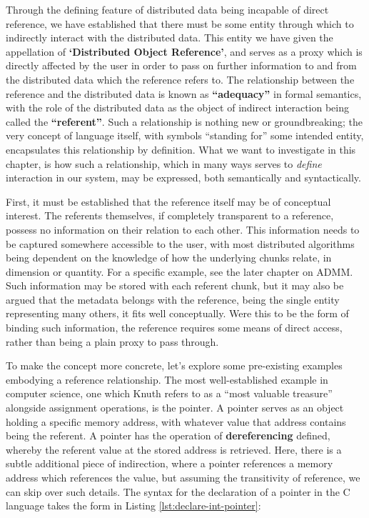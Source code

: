 Through the defining feature of distributed data being incapable of
direct reference, we have established that there must be some entity
through which to indirectly interact with the distributed data. This
entity we have given the appellation of \textbf{`Distributed Object
    Reference'}, and serves as a proxy which is directly affected by the
user in order to pass on further information to and from the distributed
data which the reference refers to. The relationship between the
reference and the distributed data is known as \textbf{``adequacy''} in
formal semantics, with the role of the distributed data as the object of
indirect interaction being called the \textbf{``referent''}. Such a
relationship is nothing new or groundbreaking; the very concept of
language itself, with symbols ``standing for'' some intended entity,
encapsulates this relationship by definition. What we want to
investigate in this chapter, is how such a relationship, which in many
ways serves to \emph{define} interaction in our system, may be
expressed, both semantically and syntactically.

First, it must be established that the reference itself may be of
conceptual interest. The referents themselves, if completely transparent
to a reference, possess no information on their relation to each other.
This information needs to be captured somewhere accessible to the user,
with most distributed algorithms being dependent on the knowledge of how
the underlying chunks relate, in dimension or quantity. For a specific
example, see the later chapter on ADMM. Such information may be stored
with each referent chunk, but it may also be argued that the metadata
belongs with the reference, being the single entity representing many
others, it fits well conceptually. Were this to be the form of binding
such information, the reference requires some means of direct access,
rather than being a plain proxy to pass through.

To make the concept more concrete, let's explore some pre-existing
examples embodying a reference relationship. The most well-established
example in computer science, one which Knuth refers to as a ``most
valuable treasure'' alongside assignment operations, is the pointer. A
pointer serves as an object holding a specific memory address, with
whatever value that address contains being the referent. A pointer has
the operation of \textbf{dereferencing} defined, whereby the referent
value at the stored address is retrieved. Here, there is a subtle
additional piece of indirection, where a pointer references a memory
address which references the value, but assuming the transitivity of
reference, we can skip over such details. The syntax for the declaration
of a pointer in the C language takes the form in Listing \cref{lst:declare-int-pointer}:

